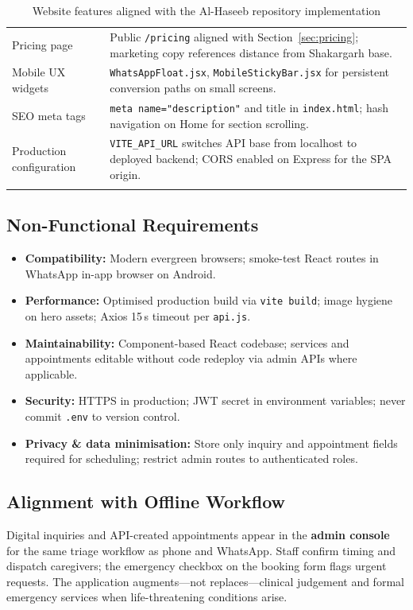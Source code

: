 \documentclass[12pt, a4paper]{article}
\begin{document}
\begin{longtable}{@{} L{4.5cm} L{9.9cm} @{}}
Pricing page &
Public \texttt{/pricing} aligned with Section~\ref{sec:pricing}; marketing copy references distance from Shakargarh base. \\[6pt]
Mobile UX widgets &
\texttt{WhatsAppFloat.jsx}, \texttt{MobileStickyBar.jsx} for persistent conversion paths on small screens. \\[6pt]
SEO meta tags &
\texttt{meta name="description"} and title in \texttt{index.html}; hash navigation on Home for section scrolling. \\[6pt]
Production configuration &
\texttt{VITE\_API\_URL} switches API base from localhost to deployed backend; CORS enabled on Express for the SPA origin. \\
\bottomrule
\caption{Website features aligned with the Al-Haseeb repository implementation}
\label{tab:web-features}
\end{longtable}

\subsection{Non-Functional Requirements}

\begin{itemize}[leftmargin=1.4em]
    \item \textbf{Compatibility:} Modern evergreen browsers; smoke-test React routes in WhatsApp in-app browser on Android.
    \item \textbf{Performance:} Optimised production build via \texttt{vite build}; image hygiene on hero assets; Axios 15\,s timeout per \texttt{api.js}.
    \item \textbf{Maintainability:} Component-based React codebase; services and appointments editable without code redeploy via admin APIs where applicable.
    \item \textbf{Security:} HTTPS in production; JWT secret in environment variables; never commit \texttt{.env} to version control.
    \item \textbf{Privacy \& data minimisation:} Store only inquiry and appointment fields required for scheduling; restrict admin routes to authenticated roles.
\end{itemize}

\subsection{Alignment with Offline Workflow}

Digital inquiries and API-created appointments appear in the \textbf{admin console} for the same triage workflow as phone and WhatsApp. Staff confirm timing and dispatch caregivers; the emergency checkbox on the booking form flags urgent requests. The application augments---not replaces---clinical judgement and formal emergency services when life-threatening conditions arise.
\end{document}
